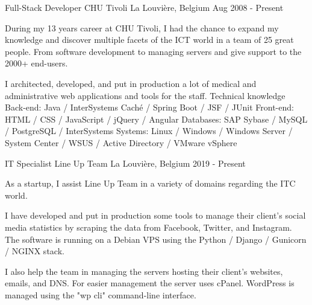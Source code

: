 

\begin{cventries}

  \cventry
    {Full-Stack Developer} %
    {CHU Tivoli} %
    {La Louvière, Belgium} %
    {Aug 2008 - Present} %
    {
During my 13 years career at CHU Tivoli, I had the chance to expand my knowledge and discover multiple facets of the ICT world in a team of 25  great people. From software development to managing servers and give support to the 2000+ end-users.
    
I architected, developed, and put in production a lot of medical and administrative web applications and tools for the staff.
    \linebreak \newline
Technical knowledge\linebreak
Back-end: Java / InterSystems Caché / Spring Boot / JSF / JUnit \linebreak
Front-end: HTML / CSS / JavaScript / jQuery / Angular \linebreak
Databases: SAP Sybase / MySQL / PostgreSQL / InterSystems \linebreak
Systems: Linux / Windows / Windows Server / System Center / WSUS / Active Directory / VMware vSphere

    }

  \cventry
    {IT Specialist} %
    {Line Up Team} %
    {La Louvière, Belgium} %
    {2019 - Present} %
    {
As a startup, I assist Line Up Team in a variety of domains regarding the ITC world.

I have developed and put in production some tools to manage their client's social media statistics by scraping the data from Facebook, Twitter, and Instagram. The software is running on a Debian VPS using the Python / Django / Gunicorn / NGINX stack.

I also help the team in managing the servers hosting their client's websites, emails, and DNS. For easier management the server uses cPanel. WordPress is managed using the "wp cli" command-line interface.

}
\end{cventries}
